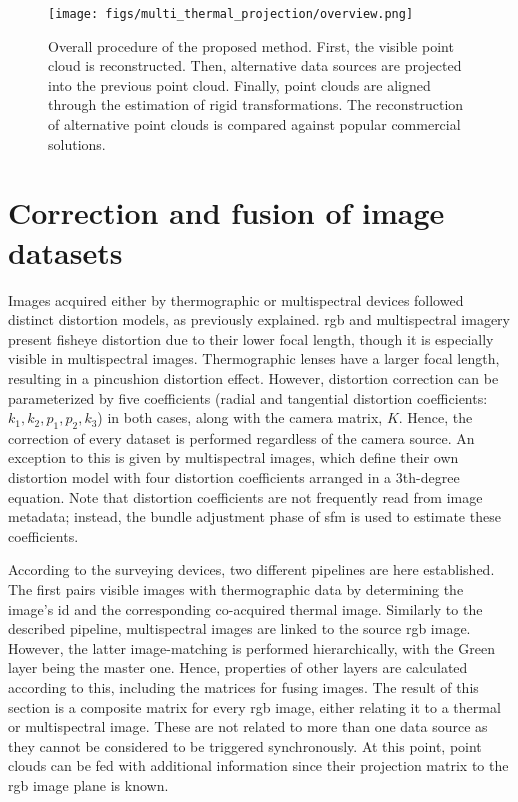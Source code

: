 \begin{figure}[ht]
    \centering
    \texttt{[image: figs/multi\_thermal\_projection/overview.png]}
    \caption{Overall procedure of the proposed method. First, the visible point cloud is reconstructed. Then, alternative data sources are projected into the previous point cloud. Finally, point clouds are aligned through the estimation of rigid transformations. The reconstruction of alternative point clouds is compared against popular commercial solutions. }
	\label{fig:multi_thermal_overview}
\end{figure}

\section{Correction and fusion of image datasets}

Images acquired either by thermographic or multispectral devices followed distinct distortion models, as previously explained. \acrshort{rgb} and multispectral imagery present fisheye distortion due to their lower focal length, though it is especially visible in multispectral images. Thermographic lenses have a larger focal length, resulting in a pincushion distortion effect. However, distortion correction can be parameterized by five coefficients (radial and tangential distortion coefficients: $k_1, k_2, p_1, p_2, k_3$) in both cases, along with the camera matrix, $K$. Hence, the correction of every dataset is performed regardless of the camera source. An exception to this is given by multispectral images, which define their own distortion model with four distortion coefficients arranged in a 3th-degree equation. Note that distortion coefficients are not frequently read from image metadata; instead, the bundle adjustment phase of \acrshort{sfm} is used to estimate these coefficients. 

According to the surveying devices, two different pipelines are here established. The first pairs visible images with thermographic data by determining the image's id and the corresponding co-acquired thermal image. Similarly to the described pipeline, multispectral images are linked to the source \acrshort{rgb} image. However, the latter image-matching is performed hierarchically, with the Green layer being the master one. Hence, properties of other layers are calculated according to this, including the matrices for fusing images. The result of this section is a composite matrix for every \acrshort{rgb} image, either relating it to a thermal or multispectral image. These are not related to more than one data source as they cannot be considered to be triggered synchronously. At this point, point clouds can be fed with additional information since their projection matrix to the \acrshort{rgb} image plane is known. 

